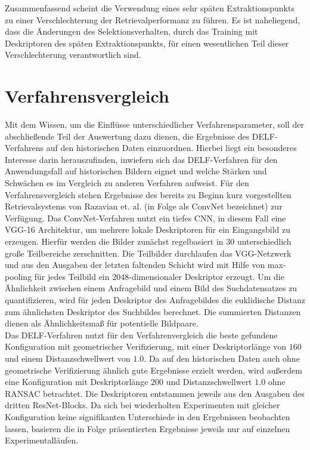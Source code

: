 Zusammenfassend scheint die Verwendung eines sehr späten Extraktionspunkts zu einer Verschlechterung der Retrievalperformanz zu führen. Es ist naheliegend, dass die Änderungen des Selektionsverhalten, durch das Training mit Deskriptoren des späten Extraktionspunkts, für einen wesentlichen Teil dieser Verschlechterung verantwortlich sind.

\newpage
\section{Verfahrensvergleich}

Mit dem Wissen, um die Einflüsse unterschiedlicher Verfahrensparameter, soll der abschließende Teil der Auswertung dazu dienen, die Ergebnisse des DELF-Verfahrens auf den historischen Daten einzuordnen. Hierbei liegt ein besonderes Interesse darin herauszufinden, inwiefern sich das DELF-Verfahren für den Anwendungsfall auf historischen Bildern eignet und welche Stärken und Schwächen es im Vergleich zu anderen Verfahren aufweist. Für den Verfahrensvergleich stehen Ergebnisse des bereits zu Beginn kurz vorgestellten Retrievalsystems von Razavian et. al. \cite{convnet} (in Folge als ConvNet bezeichnet) zur Verfügung. Das ConvNet-Verfahren nutzt ein tiefes CNN, in diesem Fall eine VGG-16 Architektur, um mehrere lokale Deskriptoren für ein Eingangsbild zu erzeugen. Hierfür werden die Bilder zunächst regelbasiert in $30$ unterschiedlich große Teilbereiche zerschnitten. Die Teilbilder durchlaufen das VGG-Netzwerk und aus den Ausgaben der letzten faltenden Schicht wird mit Hilfe von max-pooling für jedes Teilbild ein $2048$-dimensionaler Deskriptor erzeugt. Um die Ähnlichkeit zwischen einem Anfragebild und einem Bild des Suchdatensatzes zu quantifizieren, wird für jeden Deskriptor des Anfragebildes die euklidische Distanz zum ähnlichsten Deskriptor des Suchbildes berechnet. Die summierten Distanzen dienen als Ähnlichkeitsmaß für potentielle Bildpaare.
\\
Das DELF-Verfahren nutzt für den Verfahrenvergleich die beste gefundene Konfiguration mit geometrischer Verifizierung, mit einer Deskriptorlänge von $160$ und einem Distanzschwellwert von $1.0$. Da auf den historischen Daten auch ohne geometrische Verifizierung ähnlich gute Ergebnisse erzielt werden, wird außerdem eine Konfiguration mit Deskriptorlänge $200$ und Distanzschwellwert $1.0$ ohne RANSAC betrachtet. Die Deskriptoren entstammen jeweils aus den Ausgaben des dritten ResNet-Blocks. Da sich bei wiederholten Experimenten mit gleicher Konfiguration keine signifikanten Unterschiede in den Ergebnissen beobachten lassen, basieren die in Folge präsentierten Ergebnisse jeweils nur auf einzelnen Experimentalläufen.

